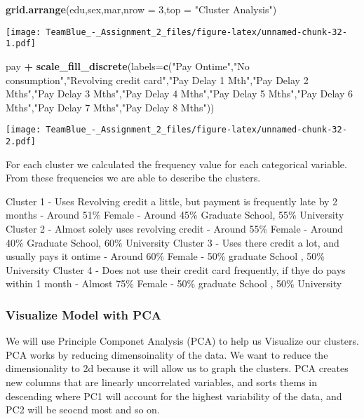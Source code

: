 \documentclass[]{article}
\newenvironment{Shaded}{\begin{snugshade}}{\end{snugshade}}
\newcommand{\KeywordTok}[1]{\textcolor[rgb]{0.13,0.29,0.53}{\textbf{#1}}}
\newcommand{\DataTypeTok}[1]{\textcolor[rgb]{0.13,0.29,0.53}{#1}}
\newcommand{\DecValTok}[1]{\textcolor[rgb]{0.00,0.00,0.81}{#1}}
\newcommand{\StringTok}[1]{\textcolor[rgb]{0.31,0.60,0.02}{#1}}
\newcommand{\OperatorTok}[1]{\textcolor[rgb]{0.81,0.36,0.00}{\textbf{#1}}}
\newcommand{\NormalTok}[1]{#1}
\begin{document}
\begin{Shaded}
\begin{Highlighting}[]
\KeywordTok{grid.arrange}\NormalTok{(edu,sex,mar,}\DataTypeTok{nrow =} \DecValTok{3}\NormalTok{,}\DataTypeTok{top =} \StringTok{"Cluster Analysis"}\NormalTok{)}
\end{Highlighting}
\end{Shaded}

\texttt{[image: TeamBlue\_-\_Assignment\_2\_files/figure-latex/unnamed-chunk-32-1.pdf]}

\begin{Shaded}
\begin{Highlighting}[]
\NormalTok{pay }\OperatorTok{+}\StringTok{ }\KeywordTok{scale_fill_discrete}\NormalTok{(}\DataTypeTok{labels=}\KeywordTok{c}\NormalTok{(}\StringTok{"Pay Ontime"}\NormalTok{,}\StringTok{"No consumption"}\NormalTok{,}\StringTok{"Revolving credit card"}\NormalTok{,}\StringTok{"Pay Delay 1 Mth"}\NormalTok{,}\StringTok{"Pay Delay 2 Mths"}\NormalTok{,}\StringTok{"Pay Delay 3 Mths"}\NormalTok{,}\StringTok{"Pay Delay 4 Mths"}\NormalTok{,}\StringTok{"Pay Delay 5 Mths"}\NormalTok{,}\StringTok{"Pay Delay 6 Mths"}\NormalTok{,}\StringTok{"Pay Delay 7 Mths"}\NormalTok{,}\StringTok{"Pay Delay 8 Mths"}\NormalTok{))}
\end{Highlighting}
\end{Shaded}

\texttt{[image: TeamBlue\_-\_Assignment\_2\_files/figure-latex/unnamed-chunk-32-2.pdf]}

For each cluster we calculated the frequency value for each categorical
variable. From these frequencies we are able to describe the clusters.

Cluster 1 - Uses Revolving credit a little, but payment is frequently
late by 2 months - Around 51\% Female - Around 45\% Graduate School,
55\% University Cluster 2 - Almost solely uses revolving credit - Around
55\% Female - Around 40\% Graduate School, 60\% University Cluster 3 -
Uses there credit a lot, and usually pays it ontime - Around 60\% Female
- 50\% graduate School , 50\% University Cluster 4 - Does not use their
credit card frequently, if thye do pays within 1 month - Almost 75\%
Female - 50\% graduate School , 50\% University

\subsubsection{Visualize Model with PCA}\label{visualize-model-with-pca}

We will use Principle Componet Analysis (PCA) to help us Visualize our
clusters. PCA works by reducing dimensoinality of the data. We want to
reduce the dimensionality to 2d because it will allow us to graph the
clusters. PCA creates new columns that are linearly uncorrelated
variables, and sorts thems in descending where PC1 will account for the
highest variability of the data, and PC2 will be seocnd most and so on.
\end{document}
